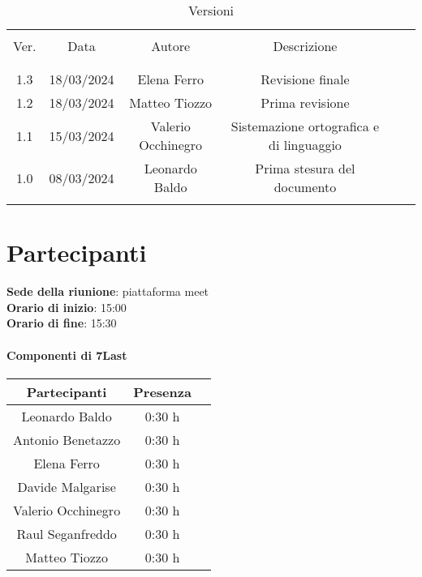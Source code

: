 \documentclass[italian,12pt]{article} %
\begin{document}


\newpage





\begin{table}[!h]
	\caption{Versioni}
	\begin{center}
		\begin{tabular}{ c c c c c c }
			\hline \\[-2ex]
			Ver. & Data & Autore & Descrizione \\
			\\[-2ex] \hline \\[-1.5ex]
			1.3 & 18/03/2024 & Elena Ferro & Revisione finale\\
			1.2 & 18/03/2024 & Matteo Tiozzo & Prima revisione \\
			1.1 & 15/03/2024 & Valerio Occhinegro& Sistemazione ortografica e di linguaggio  \\
			1.0 & 08/03/2024 & Leonardo Baldo& Prima stesura del documento \\
			\\[-1.5ex] \hline
		\end{tabular}
	\end{center}
\end{table}
\newpage

\tableofcontents

\newpage
\section{Partecipanti}

\textbf{Sede della riunione}: piattaforma meet\\
\textbf{Orario di inizio}: 15:00\\
\textbf{Orario di fine}: 15:30\\


\paragraph{Componenti di 7Last}

\begin{flushleft}
\begin{table}[!h]
\begin{tabular}{ |c|c|c| } 
	\hline
	\textbf{Partecipanti} & \textbf{Presenza} \\
	\hline 
	Leonardo Baldo 		 & 0:30 h \\ 
	Antonio Benetazzo 	 & 0:30 h \\
	Elena Ferro 		 & 0:30 h \\
	Davide Malgarise 	 & 0:30 h \\
	Valerio Occhinegro 	 & 0:30 h \\
	Raul Seganfreddo 	 & 0:30 h \\
	Matteo Tiozzo 		 & 0:30 h \\ 
	\hline
\end{tabular}
\end{table}
\end{flushleft}
\end{document}
